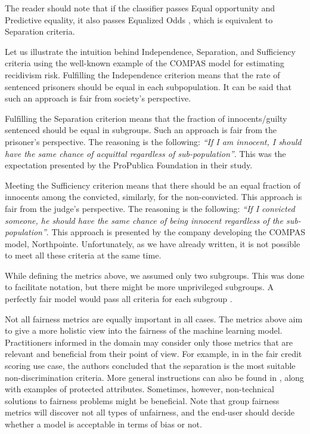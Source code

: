 The reader should note that if the classifier passes Equal opportunity
and Predictive equality, it also passes Equalized Odds
\citep{NIPS20166374}, which is equivalent to Separation criteria.

Let us illustrate the intuition behind Independence, Separation, and
Sufficiency criteria using the well-known example of the COMPAS model
for estimating recidivism risk. Fulfilling the Independence criterion
means that the rate of sentenced prisoners should be equal in each
subpopulation. It can be said that such an approach is fair from
society's perspective.

Fulfilling the Separation criterion means that the fraction of
innocents/guilty sentenced should be equal in subgroups. Such an
approach is fair from the prisoner's perspective. The reasoning is the
following: \emph{``If I am innocent, I should have the same chance of
acquittal regardless of sub-population''}. This was the expectation
presented by the ProPublica Foundation in their study.

Meeting the Sufficiency criterion means that there should be an equal
fraction of innocents among the convicted, similarly, for the
non-convicted. This approach is fair from the judge's perspective. The
reasoning is the following: \emph{``If I convicted someone, he should
have the same chance of being innocent regardless of the
sub-population''}. This approach is presented by the company developing
the COMPAS model, Northpointe. Unfortunately, as we have already
written, it is not possible to meet all these criteria at the same time.

While defining the metrics above, we assumed only two subgroups. This
was done to facilitate notation, but there might be more unprivileged
subgroups. A perfectly fair model would pass all criteria for each
subgroup \citep{barocas-hardt-narayanan}.

Not all fairness metrics are equally important in all cases. The metrics
above aim to give a more holistic view into the fairness of the machine
learning model. Practitioners informed in the domain may consider only
those metrics that are relevant and beneficial from their point of view.
For example, in \citet{KOZODOI2021} in the fair credit scoring use case,
the authors concluded that the separation is the most suitable
non-discrimination criteria. More general instructions can also be found
in \citet{EUhandbook}, along with examples of protected attributes.
Sometimes, however, non-technical solutions to fairness problems might
be beneficial. Note that group fairness metrics will discover not all
types of unfairness, and the end-user should decide whether a model is
acceptable in terms of bias or not.

